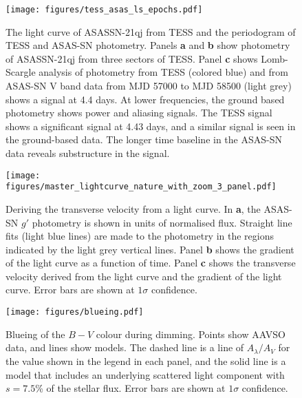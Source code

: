 \documentclass[sn-nature]{sn-jnl}%
\begin{document}
\begin{figure}
   \begin{centering}
\texttt{[image: figures/tess\_asas\_ls\_epochs.pdf]}
      \caption{The light curve of ASASSN-21qj from TESS and the periodogram of TESS and ASAS-SN photometry.
      Panels {\bf a} and {\bf b} show photometry of ASASSN-21qj from three sectors of TESS.
      Panel {\bf c} shows Lomb-Scargle analysis of photometry from TESS (colored blue) and from ASAS-SN V band data from MJD 57000 to MJD 58500 (light grey) shows a signal at 4.4 days.
      At lower frequencies, the ground based photometry shows power and aliasing signals.
      The TESS signal shows a significant signal at 4.43 days, and a similar signal is seen in the ground-based data.
      The longer time baseline in the ASAS-SN data reveals substructure in the signal.}
        \label{fig:TESS_lc}
    \end{centering}
\end{figure}

\begin{figure*}
\begin{centering}
\texttt{[image: figures/master\_lightcurve\_nature\_with\_zoom\_3\_panel.pdf]}
      \caption{Deriving the transverse velocity from a light curve.
      In {\bf a}, the ASAS-SN $g'$ photometry is shown in units of normalised flux.
      Straight line fits (light blue lines) are made to the photometry in the regions indicated by the light grey vertical lines.
      Panel {\bf b} shows the gradient of the light curve as a function of time.
      Panel {\bf c} shows the transverse velocity derived from the light curve and the gradient of the light curve.
      Error bars are shown at $1\sigma$ confidence.
}
        \label{fig:gradientconvert}
\end{centering}
\end{figure*}

\begin{figure}
    \centering
\texttt{[image: figures/blueing.pdf]}
    \caption{Blueing of the $B-V$ colour during dimming.
    Points show AAVSO data, and lines show models.
    The dashed line is a line of $A_\lambda/A_V$ for the value shown in the legend in each panel, and the solid line is a model that includes an underlying scattered light component with $s=7.5$\% of the stellar flux.
    Error bars are shown at $1\sigma$ confidence.
}
    \label{fig:blueing}
\end{figure}
\end{document}
